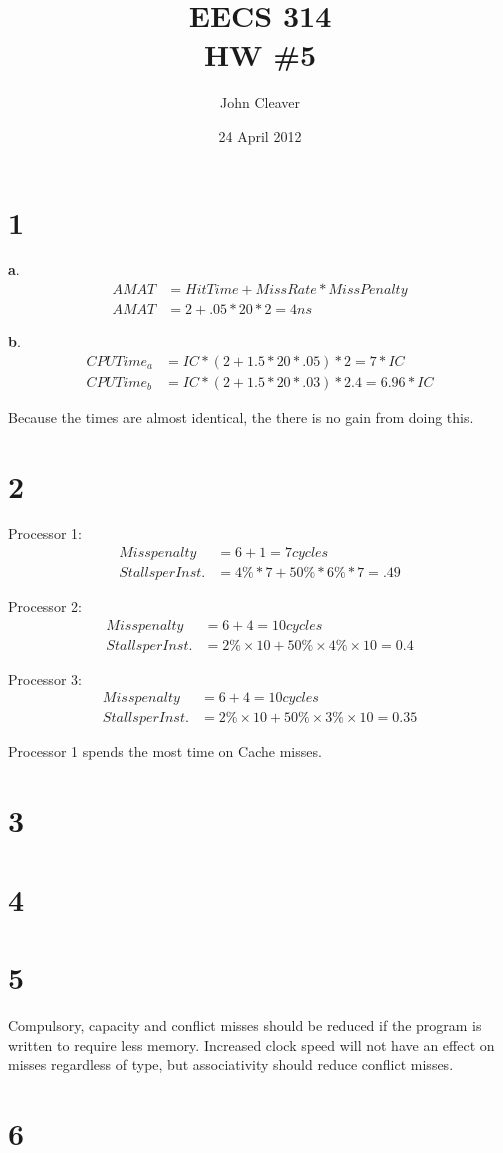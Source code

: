 \documentclass{article}
\title{EECS 314 \\ HW \#5}
\author{John Cleaver}
\date{24 April 2012}
\begin{document}
\maketitle

\section*{1}

{\bf a}.
\begin{align*}
AMAT &= Hit Time + Miss Rate * Miss Penalty \\
AMAT &= 2 + .05 * 20 * 2 = 4 ns
\end{align*}

{\bf b}.
\begin{align*}
CPU Time_a &= IC * (2 + 1.5 * 20 * .05) * 2   = 7 * IC \\
CPU Time_b &= IC * (2 + 1.5 * 20 * .03) * 2.4 = 6.96 * IC
\end{align*}

Because the times are almost identical, the there is no gain from doing this.

\section*{2} 

Processor 1:
\begin{align*}
Miss penalty &= 6 + 1 = 7 cycles \\
Stalls per Inst. &= 4\% * 7 + 50\% * 6\% * 7 =.49
\end{align*}

Processor 2:
\begin{align*}
Miss penalty &= 6 + 4 = 10 cycles \\
Stalls per Inst. &= 2\% × 10 + 50\% × 4\% × 10 = 0.4
\end{align*}

Processor 3:
\begin{align*}
Miss penalty &= 6 + 4 = 10 cycles \\
Stalls per Inst. &= 2\% × 10 + 50\% × 3\% × 10 = 0.35
\end{align*}

Processor 1 spends the most time on Cache misses.

\section*{3}

\section*{4}

\section*{5} 

Compulsory, capacity and conflict misses should be reduced if the program is written to require less memory. Increased clock speed will not have an effect on misses regardless of type, but associativity should reduce conflict misses.

\section*{6}
\end{document}
